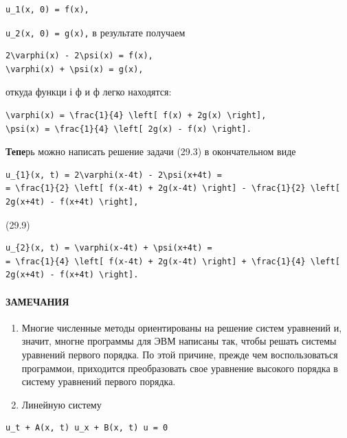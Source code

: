 \documentclass[
  ukrainian,
]{article}
\begin{document}
\begin{verbatim}
u_1(x, 0) = f(x),
\end{verbatim}

\texttt{u\_2(x,\ 0)\ =\ g(x),} в результате получаем

\begin{verbatim}
2\varphi(x) - 2\psi(x) = f(x),
\varphi(x) + \psi(x) = g(x),
\end{verbatim}

откуда функци і ф и ф легко находятся:

\begin{verbatim}
\varphi(x) = \frac{1}{4} \left[ f(x) + 2g(x) \right],
\psi(x) = \frac{1}{4} \left[ 2g(x) - f(x) \right].
\end{verbatim}

\textbf{Тепе}рь можно написать решение задачи (29.3) в окончательном
виде

\begin{verbatim}
u_{1}(x, t) = 2\varphi(x-4t) - 2\psi(x+4t) =
= \frac{1}{2} \left[ f(x-4t) + 2g(x-4t) \right] - \frac{1}{2} \left[ 2g(x+4t) - f(x+4t) \right],
\end{verbatim}

(29.9)

\begin{verbatim}
u_{2}(x, t) = \varphi(x-4t) + \psi(x+4t) =
= \frac{1}{4} \left[ f(x-4t) + 2g(x-4t) \right] + \frac{1}{4} \left[ 2g(x+4t) - f(x+4t) \right].
\end{verbatim}

\paragraph{ЗАМЕЧАНИЯ}\label{ux437ux430ux43cux435ux447ux430ux43dux438ux44f-1}

\begin{enumerate}
\def\labelenumi{\arabic{enumi}.}
\item
  Многие численные методы ориентированы на решение систем уравнений и,
  значит, многне программы для ЭВМ написаны так, чтобы решать системы
  уравнений первого порядка. По этой причине, прежде чем воспользоваться
  программои, приходится преобразовать свое уравнение высокого порядка в
  систему уравнений первого порядка.
\item
  Линейную систему
\end{enumerate}

\begin{verbatim}
u_t + A(x, t) u_x + B(x, t) u = 0
\end{verbatim}
\end{document}
